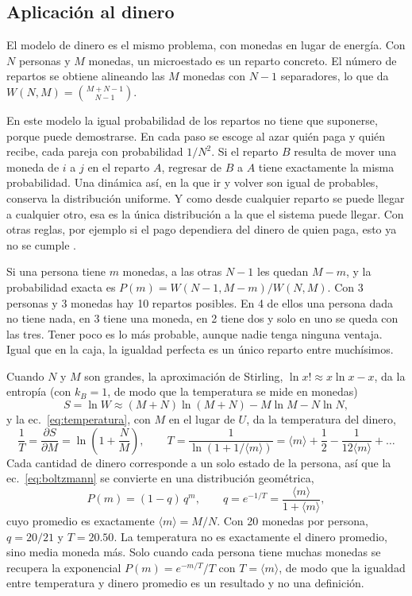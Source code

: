 \documentclass[letterpaper,12pt]{article}
\begin{document}
\subsection*{Aplicación al dinero}
El modelo de dinero es el mismo problema, con monedas en lugar de energía. Con $N$ personas y $M$ monedas, un microestado es un reparto concreto. El número de repartos se obtiene alineando las $M$ monedas con $N-1$ separadores, lo que da $W(N,M)=\binom{M+N-1}{N-1}$.

En este modelo la igual probabilidad de los repartos no tiene que suponerse, porque puede demostrarse. En cada paso se escoge al azar quién paga y quién recibe, cada pareja con probabilidad $1/N^2$. Si el reparto $B$ resulta de mover una moneda de $i$ a $j$ en el reparto $A$, regresar de $B$ a $A$ tiene exactamente la misma probabilidad. Una dinámica así, en la que ir y volver son igual de probables, conserva la distribución uniforme. Y como desde cualquier reparto se puede llegar a cualquier otro, esa es la única distribución a la que el sistema puede llegar. Con otras reglas, por ejemplo si el pago dependiera del dinero de quien paga, esto ya no se cumple \cite{yr2009}.

Si una persona tiene $m$ monedas, a las otras $N-1$ les quedan $M-m$, y la probabilidad exacta es $P(m)=W(N-1,M-m)/W(N,M)$. Con 3 personas y 3 monedas hay 10 repartos posibles. En 4 de ellos una persona dada no tiene nada, en 3 tiene una moneda, en 2 tiene dos y solo en uno se queda con las tres. Tener poco es lo más probable, aunque nadie tenga ninguna ventaja. Igual que en la caja, la igualdad perfecta es un único reparto entre muchísimos.

Cuando $N$ y $M$ son grandes, la aproximación de Stirling, $\ln x!\approx x\ln x-x$, da la entropía (con $k_B=1$, de modo que la temperatura se mide en monedas)
\begin{equation}
  S=\ln W\approx(M+N)\ln(M+N)-M\ln M-N\ln N ,
\end{equation}
y la ec.~\ref{eq:temperatura}, con $M$ en el lugar de $U$, da la temperatura del dinero,
\begin{equation}
  \frac{1}{T}=\frac{\partial S}{\partial M}=\ln\!\left(1+\frac{N}{M}\right),
  \qquad
  T=\frac{1}{\ln(1+1/\langle m\rangle)}=\langle m\rangle+\frac12-\frac{1}{12\langle m\rangle}+\dots
  \label{eq:tdinero}
\end{equation}
Cada cantidad de dinero corresponde a un solo estado de la persona, así que la ec.~\ref{eq:boltzmann} se convierte en una distribución geométrica,
\begin{equation}
  P(m)=(1-q)\,q^{m},\qquad q=e^{-1/T}=\frac{\langle m\rangle}{1+\langle m\rangle},
  \label{eq:geometrica}
\end{equation}
cuyo promedio es exactamente $\langle m\rangle=M/N$. Con 20 monedas por persona, $q=20/21$ y $T=20.50$. La temperatura no es exactamente el dinero promedio, sino media moneda más. Solo cuando cada persona tiene muchas monedas se recupera la exponencial $P(m)=e^{-m/T}/T$ con $T=\langle m\rangle$, de modo que la igualdad entre temperatura y dinero promedio es un resultado y no una definición.
\end{document}
